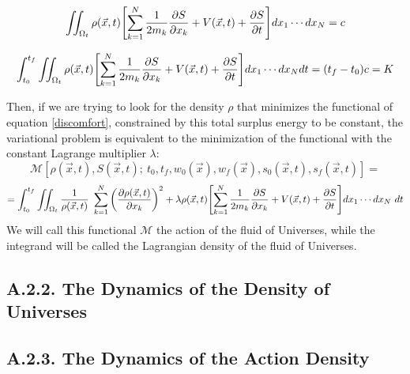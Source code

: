 \documentclass[11pt, a4paper]{article} %
\newcommand{\M}{\mathcal{M}}
\begin{document}
$$
\iint_{\Omega_t} \rho(\vec{x},t) \qty[ \sum_{k=1}^N \frac{1}{2m_k} \pdv{S}{x_k}+V(\vec{x},t)+\pdv{S}{t} ] dx_1\cdots dx_N = c
$$

$$
\int_{t_0}^{t_f}\iint_{\Omega_t} \rho(\vec{x},t) \qty[ \sum_{k=1}^N \frac{1}{2m_k} \pdv{S}{x_k}+V(\vec{x},t)+\pdv{S}{t} ] dx_1\cdots dx_N dt= (t_f-t_0)c=K
$$%

Then, if we are trying to look for the density $\rho$ that minimizes the functional of equation \eqref{discomfort}, constrained by this total surplus energy to be constant, the variational problem is equivalent to the minimization of the functional with the constant Lagrange multiplier $\lambda$:
\begin{equation}\label{discomfort}
\M[\rho(\vec{x},t), S(\vec{x},t);\ t_0,t_f,w_0(\vec{x}), w_f(\vec{x}), s_0(\vec{x},t), s_f(\vec{x},t)]=
\end{equation} 
$$
=\int_{t_0}^{t_f} \iint_{\Omega_t} \frac{1}{\rho(\vec{x},t)}\ \sum_{k=1}^N \qty(\pdv{\rho(\vec{x},t)}{x_k})^2 + \lambda \rho(\vec{x},t) \qty[ \sum_{k=1}^N \frac{1}{2m_k} \pdv{S}{x_k}+V(\vec{x},t)+\pdv{S}{t} ]  dx_1\cdots dx_N\ dt
$$
We will call this functional $\M$ the action of the fluid of Universes, while the integrand will be called the Lagrangian density of the fluid of Universes.






\subsection*{A.2.2. The Dynamics of the Density of Universes}



\subsection*{A.2.3. The Dynamics of the Action Density}

\end{document}
